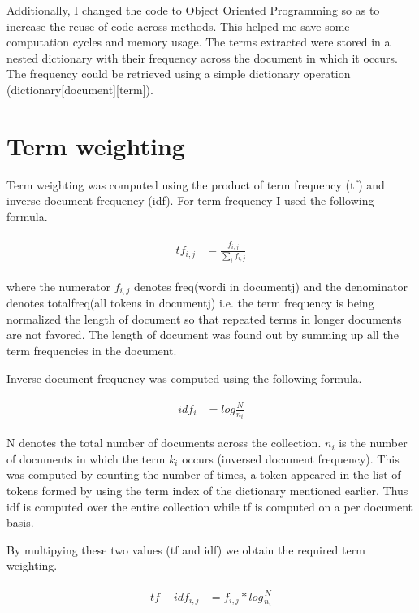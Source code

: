 \documentclass[paper=a4, fontsize=11pt]{scrartcl}
\numberwithin{equation}{section}		%
\numberwithin{figure}{section}			%
\numberwithin{table}{section}				%
\begin{document}
Additionally, I changed the code to Object Oriented Programming so as to increase the reuse of code across methods. This helped me save some computation cycles and memory usage. The terms extracted were stored in a nested dictionary with their frequency across the document in which it occurs. The frequency could be retrieved using a simple dictionary operation (dictionary[document][term]).   

\section{Term weighting}

Term weighting was computed using the product of term frequency (tf) and inverse document frequency (idf). For term frequency I used the following formula.
 
\begin{align} 
	\begin{split}
	tf_{i,j} 	&= \frac{f_{i,j}}{\sum\limits_{i} f_{i,j}}  
	\end{split}					
\end{align}

where the numerator $f_{i,j}$ denotes freq(wordi in documentj) and the denominator denotes totalfreq(all tokens in documentj) i.e. the term frequency is being normalized the length of document so that repeated terms in longer documents are not favored. The length of document was found out by summing up all the term frequencies in the document.

Inverse document frequency was computed using the following formula. 

\begin{align} 
	\begin{split}
	idf_{i} 	&= log\frac{N}{n_{i}}  
	\end{split}					
\end{align}


N denotes the total number of documents across the collection. $n_{i}$ is the number of documents in which the term $k_{i}$ occurs (inversed document frequency). This was computed by counting the number of times, a token appeared in the list of tokens formed by using the term index of the dictionary mentioned earlier. Thus idf is computed over the entire collection while tf is computed on a per document basis. 

By multipying these two values (tf and idf) we obtain the required term weighting.

\begin{align} 
	\begin{split}
	tf-idf_{i, j} 	&= f_{i,j} * log\frac{N}{n_{i}}  
	\end{split}					
\end{align}
\end{document}
